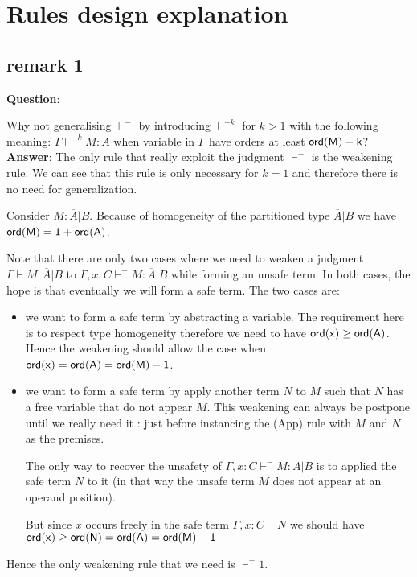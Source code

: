 \documentclass{article}
\def\ord{\sf ord}
\begin{document}
\section{Rules design explanation}

\subsection{remark 1}

\textbf{Question}:

Why not generalising $\vdash^-$ by introducing $\vdash^{-k}$ for
$k>1$ with the following meaning: $ \Gamma \vdash^{-k} M : A$ when
variable in $\Gamma$ have orders at least $\ord(M)-k$?
\\


\textbf{Answer}: The only rule that really exploit the judgment
$\vdash^-$ is the weakening rule. We can see that this rule is only
necessary for $k=1$ and therefore there is no need for
generalization.



Consider $M : \overline{A} | B$. Because of homogeneity of the
partitioned type $\overline{A} | B$ we have $\ord(M) = 1 + \ord(A)$.

Note that there are only two cases where we need to weaken a
judgment $\Gamma \vdash M : \overline{A} | B$ to $\Gamma, x: C
\vdash^- M : \overline{A} | B$ while forming an unsafe term. In both
cases, the hope is that eventually we will form a safe term. The two
cases are:

\begin{itemize}
\item
 we want to form a safe term by abstracting a variable. The requirement here is to respect type homogeneity
 therefore we need to have $\ord(x) \geq \ord(A)$.
Hence the weakening should allow the case when $\ord(x) = \ord(A) =
\ord(M) - 1$.

\item
 we want to form a safe term by apply another term $N$ to $M$ such
that $N$ has a free variable that do not appear $M$. This weakening
can always be postpone until we really need it : just before
instancing the (App) rule with $M$ and $N$ as the premises.

The only way to recover the unsafety of $\Gamma, x: C \vdash^- M :
\overline{A} | B$ is to applied the safe term $N$ to it (in that way
the unsafe term $M$ does not appear at an operand position).

But since $x$ occurs freely in the safe term $\Gamma, x: C \vdash N$
we should have $\ord(x) \geq \ord(N) = \ord(A) = \ord(M) -1$
\end{itemize}

Hence the only weakening rule that we need is $\vdash^-1$.
\end{document}
